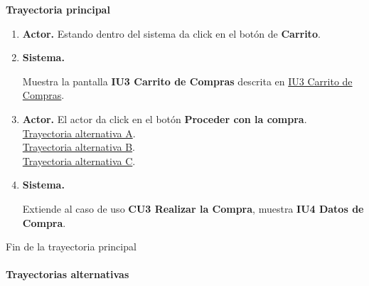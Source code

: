 \noindent \textbf{Trayectoria principal}

\begin{enumerate}
	
	\item {\textbf{Actor.}} Estando dentro del sistema da click en el botón de \textbf{Carrito}.
	
	\item \hypertarget{CU2:TP:P4}{\textbf{Sistema.}} Muestra la pantalla \textbf{IU3 Carrito de Compras} descrita en \hyperlink{IU3}{IU3 Carrito de Compras}.
	
	\item \textbf{Actor.} El actor da click en el botón  \textbf{Proceder con la compra}.
	\\ \hyperlink{CU2:TAA}{Trayectoria alternativa A}.
	\\ \hyperlink{CU2:TAB}{Trayectoria alternativa B}. 
	\\ \hyperlink{CU2:TAC}{Trayectoria alternativa C}. 
	
	\item \hypertarget{CU1:TP:P4}{\textbf{Sistema.}} Extiende al caso de uso \textbf{CU3 Realizar la Compra}, muestra \textbf{IU4 Datos de Compra}.
	

\end{enumerate}	
Fin de la trayectoria principal
\\
\noindent \textbf{\\Trayectorias alternativas}

